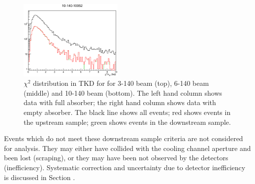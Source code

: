 \begin{figure}[!tbh]
    \includegraphics*[width=0.45\textwidth]{analysis_plots/plots_10-140-empty/chi2_tkd.eps}
    \caption{$\chi^2$ distribution in TKD for for 3-140 beam (top), 6-140 beam (middle) and 10-140 beam (bottom).
    The left hand column shows data with full absorber; the right hand column shows data with empty absorber.
    The black line shows all events; red shows events in the upstream sample; green shows events in the downstream sample.
\label{fig:tkd_chi2}}
\end{figure}

Events which do not meet these downstream sample criteria are not considered
for analysis. They may either have collided with the cooling channel aperture 
and been lost (scraping), or 
they may have been not observed by the detectors (inefficiency). Systematic 
correction and uncertainty due to detector inefficiency is discussed in Section 
\cite{sec:inefficiency}.
